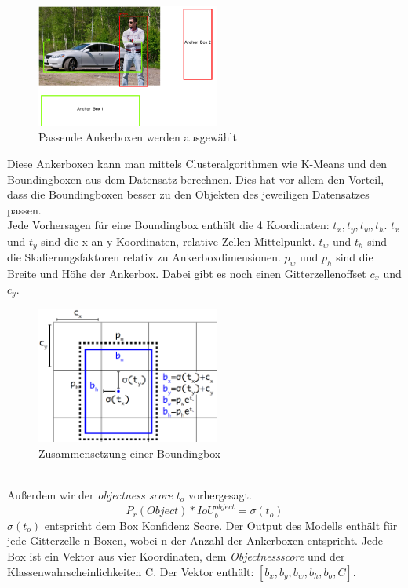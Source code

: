 \documentclass[conference]{IEEEtran}
\begin{document}
	\begin{figure}[!h]
		\begin{center}
			\includegraphics[width=6cm]{Media/Ankerboxen.png}
			\caption{Passende Ankerboxen werden ausgewählt\cite{b0}}
			\label{Anker}
		\end{center}
	\end{figure}
	Diese Ankerboxen kann man mittels Clusteralgorithmen wie K-Means und den Boundingboxen aus dem Datensatz berechnen. Dies hat vor allem den Vorteil, dass die Boundingboxen besser zu den Objekten des jeweiligen Datensatzes passen.\\
	Jede Vorhersagen für eine Boundingbox enthält die 4 Koordinaten: $t_x, t_y, t_w, t_h$. $t_x$ und $ t_y$ sind die x an y Koordinaten, relative Zellen Mittelpunkt. $t_w$ und $ t_h$ sind die Skalierungsfaktoren relativ zu Ankerboxdimensionen. $p_w$ und $p_h$ sind die Breite und Höhe der Ankerbox. Dabei gibt es noch einen Gitterzellenoffset $c_x$ und $c_y$.
	\begin{figure}[!h]
		\begin{center}
			\includegraphics[width=6cm]{Media/YoloV3PredictionBox.png}
			\caption{Zusammensetzung einer Boundingbox\cite{b3}}
			\label{PredictionBox}
		\end{center}
	\end{figure}\\
	Außerdem wir der \textit{objectness score} $t_o$ vorhergesagt.
	\[ P_r(Object)*IoU_{b}^{object} = \sigma(t_o) \]
	$\sigma(t_o)$ entspricht dem Box Konfidenz Score.
	Der Output des Modells enthält für jede Gitterzelle n Boxen, wobei n der Anzahl der Ankerboxen entspricht. Jede Box ist ein Vektor aus vier Koordinaten, dem \textit{Objectnessscore} und der Klassenwahrscheinlichkeiten C. Der Vektor enthält: $[b_x,b_y,b_w,b_h, b_o, C]$\cite{b3}.
\end{document}
